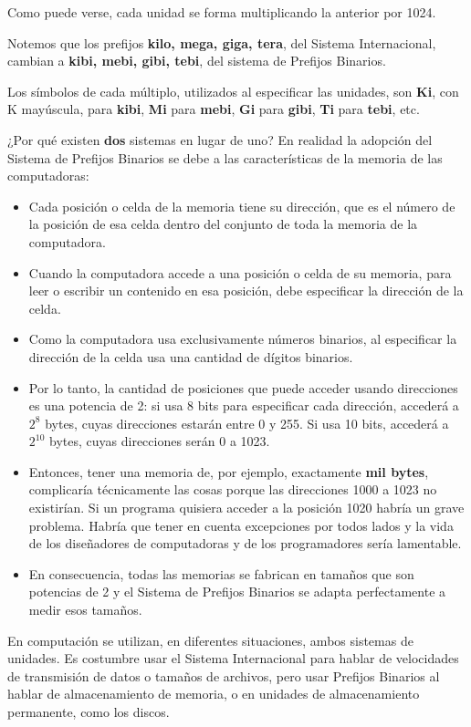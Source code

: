 \documentclass[spanish,A4,]{article}
\begin{document}
Como puede verse, cada unidad se forma multiplicando la anterior por
1024.

Notemos que los prefijos \textbf{kilo, mega, giga, tera}, del Sistema
Internacional, cambian a \textbf{kibi, mebi, gibi, tebi}, del sistema de
Prefijos Binarios.

Los símbolos de cada múltiplo, utilizados al especificar las unidades,
son \textbf{Ki}, con K mayúscula, para \textbf{kibi}, \textbf{Mi} para
\textbf{mebi}, \textbf{Gi} para \textbf{gibi}, \textbf{Ti} para
\textbf{tebi}, etc.

¿Por qué existen \textbf{dos} sistemas en lugar de uno? En realidad la
adopción del Sistema de Prefijos Binarios se debe a las características
de la memoria de las computadoras:

\begin{itemize}
\itemsep1pt\parskip0pt
\item
  Cada posición o celda de la memoria tiene su dirección, que es el
  número de la posición de esa celda dentro del conjunto de toda la
  memoria de la computadora.
\item
  Cuando la computadora accede a una posición o celda de su memoria,
  para leer o escribir un contenido en esa posición, debe especificar la
  dirección de la celda.
\item
  Como la computadora usa exclusivamente números binarios, al
  especificar la dirección de la celda usa una cantidad de dígitos
  binarios.
\item
  Por lo tanto, la cantidad de posiciones que puede acceder usando
  direcciones es una potencia de 2: si usa 8 bits para especificar cada
  dirección, accederá a $2^8$ bytes, cuyas direcciones estarán entre 0 y
  255. Si usa 10 bits, accederá a $2^{10}$ bytes, cuyas direcciones
  serán 0 a 1023.
\item
  Entonces, tener una memoria de, por ejemplo, exactamente \textbf{mil
  bytes}, complicaría técnicamente las cosas porque las direcciones 1000
  a 1023 no existirían. Si un programa quisiera acceder a la posición
  1020 habría un grave problema. Habría que tener en cuenta excepciones
  por todos lados y la vida de los diseñadores de computadoras y de los
  programadores sería lamentable.
\item
  En consecuencia, todas las memorias se fabrican en tamaños que son
  potencias de 2 y el Sistema de Prefijos Binarios se adapta
  perfectamente a medir esos tamaños.
\end{itemize}

En computación se utilizan, en diferentes situaciones, ambos sistemas de
unidades. Es costumbre usar el Sistema Internacional para hablar de
velocidades de transmisión de datos o tamaños de archivos, pero usar
Prefijos Binarios al hablar de almacenamiento de memoria, o en unidades
de almacenamiento permanente, como los discos.
\end{document}
